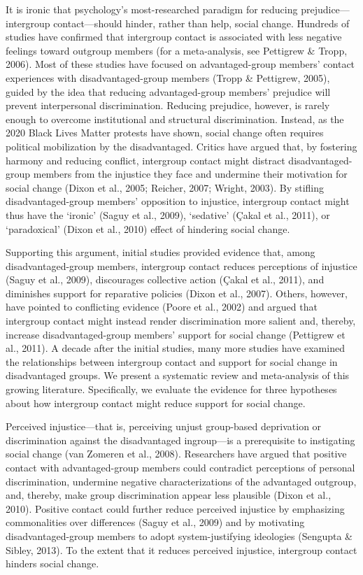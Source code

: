 \documentclass[twocolumn, 11pt, letterpaper]{article}
\begin{document}
\noindent It is ironic that psychology's most-researched paradigm for reducing
prejudice---intergroup contact---should hinder, rather than help, social
change. Hundreds of studies have confirmed that intergroup contact is
associated with less negative feelings toward outgroup members (for a
meta-analysis, see Pettigrew \& Tropp, 2006). Most of these studies have
focused on advantaged-group members' contact experiences with
disadvantaged-group members (Tropp \& Pettigrew, 2005), guided by the
idea that reducing advantaged-group members' prejudice will prevent
interpersonal discrimination. Reducing prejudice, however, is rarely
enough to overcome institutional and structural discrimination. Instead,
as the 2020 Black Lives Matter protests have shown, social change often
requires political mobilization by the disadvantaged. Critics have
argued that, by fostering harmony and reducing conflict, intergroup
contact might distract disadvantaged-group members from the injustice
they face and undermine their motivation for social change (Dixon et
al., 2005; Reicher, 2007; Wright, 2003). By stifling disadvantaged-group
members' opposition to injustice, intergroup contact might thus have the
`ironic' (Saguy et al., 2009), `sedative' (Çakal et al., 2011), or
`paradoxical' (Dixon et al., 2010) effect of hindering social change.

Supporting this argument, initial studies provided evidence that, among
disadvantaged-group members, intergroup contact reduces perceptions of
injustice (Saguy et al., 2009), discourages collective action (Çakal et
al., 2011), and diminishes support for reparative policies (Dixon et
al., 2007). Others, however, have pointed to conflicting evidence (Poore
et al., 2002) and argued that intergroup contact might instead render
discrimination more salient and, thereby, increase disadvantaged-group
members' support for social change (Pettigrew et al., 2011). A decade
after the initial studies, many more studies have examined the
relationships between intergroup contact and support for social change
in disadvantaged groups. We present a systematic review and
meta-analysis of this growing literature. Specifically, we evaluate the
evidence for three hypotheses about how intergroup contact might reduce
support for social change.

Perceived injustice---that is, perceiving unjust group-based deprivation
or discrimination against the disadvantaged ingroup---is a prerequisite
to instigating social change (van Zomeren et al., 2008). Researchers
have argued that positive contact with advantaged-group members could
contradict perceptions of personal discrimination, undermine negative
characterizations of the advantaged outgroup, and, thereby, make group
discrimination appear less plausible (Dixon et al., 2010). Positive
contact could further reduce perceived injustice by emphasizing
commonalities over differences (Saguy et al., 2009) and by motivating
disadvantaged-group members to adopt system-justifying ideologies
(Sengupta \& Sibley, 2013). To the extent that it reduces perceived
injustice, intergroup contact hinders social change.
\end{document}
